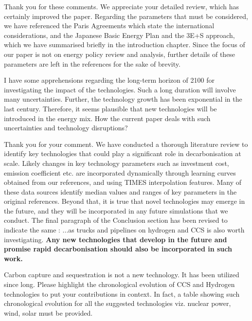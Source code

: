 \documentclass[answers,11pt]{exam}
\begin{document}
\begin{questions}
        \begin{solution}
                Thank you for these comments. We appreciate your detailed review, which has certainly improved the paper. Regarding the parameters that must be considered, we have referenced the Paris Agreements which state the international considerations, and the Japanese Basic Energy Plan and the 3E+S approach, which we have summarised briefly in the introduction chapter. Since the focus of our paper is not on energy policy review and analysis, further details of these parameters are left in the references for the sake of brevity.
        \end{solution}


        \question I have some apprehensions regarding the long-term horizon of 2100 for investigating the impact of the technologies. Such a long duration will involve many uncertainties. Further, the technology growth has been exponential in the last century. Therefore, it seems plausible that new technologies will be introduced in the energy mix. How the current paper deals with such uncertainties and technology disruptions?
        
        \begin{solution}
                 Thank you for your comment. We have conducted a thorough literature review to identify key technologies that could play a significant role in decarbonisation at scale. Likely changes in key technology parameters such as investment cost, emission coefficient etc. are incorporated dynamically through learning curves obtained from our references, and using TIMES interpolation features. Many of these data sources identify median values and ranges of key parameters in the original references. Beyond that, it is true that novel technologies may emerge in the future, and they will be incorporated in any future simulations that we conduct. The final paragraph of the Conclusion section has been revised to indicate the same :
                 ...as trucks and pipelines on hydrogen and CCS is also worth investigating. \textbf{Any new technologies that develop in the future and promise rapid decarbonisation should also be incorporated in such work.}
                 
                 
        \end{solution}
        
                \question Carbon capture and sequestration is not a new technology. It has been utilized since long. Please highlight the chronological evolution of CCS and Hydrogen technologies to put your contributions in context. In fact, a table showing such chronological evolution for all the suggested technologies viz. nuclear power, wind, solar must be provided. 
        

\end{questions}
\end{document}
